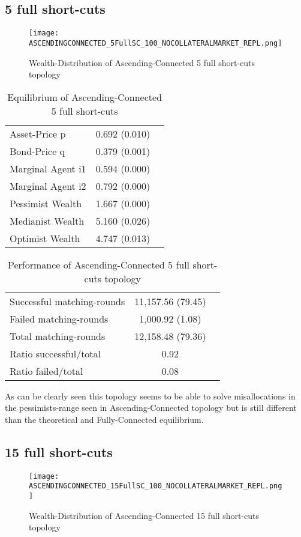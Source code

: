 \documentclass[Bachelorarbeit.tex]{subfiles}
\begin{document}
\subsection{5 full short-cuts}
\begin{figure}[H]
	\centering
  \texttt{[image: ASCENDINGCONNECTED\_5FullSC\_100\_NOCOLLATERALMARKET\_REPL.png]}
	\caption{Wealth-Distribution of Ascending-Connected 5 full short-cuts topology}
	\label{fig:wealth_ASCENDINGCONNECTED_5FullSC_100_NOCOLLATERALMARKET_REPL}
\end{figure}

\begin{table}[H]
	\caption{Equilibrium of Ascending-Connected 5 full short-cuts}
	\centering
	\begin{tabular} { l c r }
		\hline
		Asset-Price p & 0.692 (0.010) \\
		Bond-Price q & 0.379 (0.001) \\
		Marginal Agent i1 & 0.594 (0.000) \\
		Marginal Agent i2 & 0.792 (0.000) \\
		\hline
		Pessimist Wealth & 1.667 (0.000) \\
		Medianist Wealth & 5.160 (0.026) \\
		Optimist Wealth & 4.747 (0.013) \\
		\hline
	\end{tabular}
\end{table} 

\begin{table}[H]
	\caption{Performance of Ascending-Connected 5 full short-cuts topology}
	\centering
	\begin{tabular} { l c r }
		\hline
		Successful matching-rounds & 11,157.56 (79.45) \\
		Failed matching-rounds & 1,000.92 (1.08) \\
		Total matching-rounds & 12,158.48 (79.36) \\
		\hline
		Ratio successful/total & 0.92 \\
		Ratio failed/total & 0.08 \\
		\hline
	\end{tabular}
\end{table}

As can be clearly seen this topology seems to be able to solve misallocations in the pessimists-range seen in Ascending-Connected topology but is still different than the theoretical and Fully-Connected equilibrium.

\subsection{15 full short-cuts}
\begin{figure}[H]
	\centering
  \texttt{[image: ASCENDINGCONNECTED\_15FullSC\_100\_NOCOLLATERALMARKET\_REPL.png]}
	\caption{Wealth-Distribution of Ascending-Connected 15 full short-cuts topology}
	\label{fig:wealth_ASCENDINGCONNECTED_15FullSC_100_NOCOLLATERALMARKET_REPL}
\end{figure}
\end{document}
